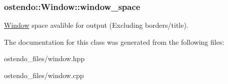 \subsubsection[{\texorpdfstring{window\+\_\+space}{window_space}}]{ ostendo\+::\+Window\+::window\+\_\+space}\hypertarget{classostendo_1_1Window_a17ba58f5d7098c05f56550db36b64a9b}{}\label{classostendo_1_1Window_a17ba58f5d7098c05f56550db36b64a9b}
\hyperlink{classostendo_1_1Window}{Window} space avalible for output (Excluding borders/title). 

The documentation for this class was generated from the following files\+:\begin{DoxyCompactItemize}
\item 
ostendo\+\_\+files/window.\+hpp\item 
ostendo\+\_\+files/window.\+cpp\end{DoxyCompactItemize}
